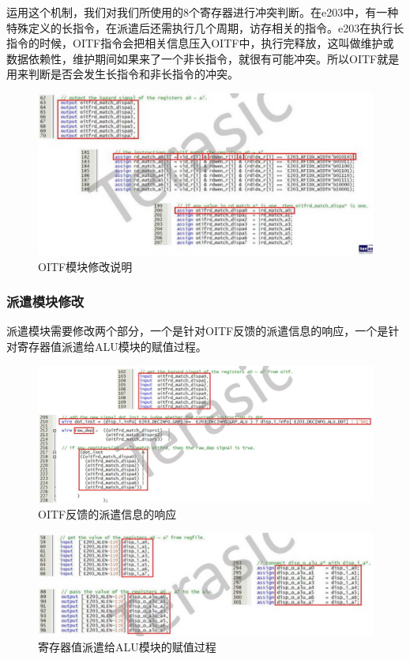 \documentclass[a4paper, 14pt, oneside]{book} %
\numberwithin{equation}{subsection}
\begin{document}
	运用这个机制，我们对我们所使用的8个寄存器进行冲突判断。在e203中，有一种特殊定义的长指令，在派遣后还需执行几个周期，访存相关的指令。e203在执行长指令的时候，OITF指令会把相关信息压入OITF中，执行完释放，这叫做维护或数据依赖性，维护期间如果来了一个非长指令，就很有可能冲突。所以OITF就是用来判断是否会发生长指令和非长指令的冲突。
	\begin{figure}[H]
		\centering
		\includegraphics[scale=0.8]{img/OITF.jpg}
		\caption{OITF模块修改说明}
	\end{figure}
	
	\subsubsection{派遣模块修改}
	派遣模块需要修改两个部分，一个是针对OITF反馈的派遣信息的响应，一个是针对寄存器值派遣给ALU模块的赋值过程。
	\begin{figure}[H]
		\centering
		\includegraphics[scale=0.6]{img/dispatch1.jpg}
		\caption{OITF反馈的派遣信息的响应}
	\end{figure}
	\begin{figure}[H]
		\centering
		\includegraphics[scale=0.6]{img/dispatch2.jpg}
		\caption{寄存器值派遣给ALU模块的赋值过程}
	\end{figure}
\end{document}

